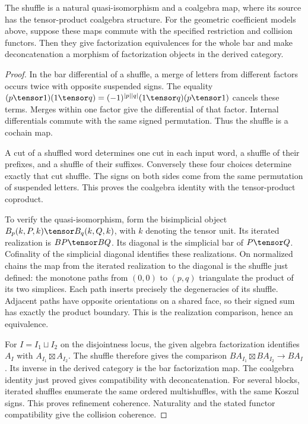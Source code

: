 \begin{proposition}
The shuffle is a natural quasi-isomorphism and a coalgebra map,
where its source has the tensor-product coalgebra structure.
For the geometric coefficient models above, suppose these maps commute with the specified
restriction and collision functors.
Then they give factorization equivalences for the whole bar and make
deconcatenation a morphism of factorization objects in the derived category.
\end{proposition}
\begin{proof}
In the bar differential of a shuffle, a merge of letters from different factors
occurs twice with opposite suspended signs.
The equality $(p\tensor1)(1\tensor q)=(-1)^{|p||q|}(1\tensor q)(p\tensor1)$ cancels these terms.
Merges within one factor give the differential of that factor.
Internal differentials commute with the same signed permutation.
Thus the shuffle is a cochain map.

A cut of a shuffled word determines one cut in each input word,
a shuffle of their prefixes, and a shuffle of their suffixes.
Conversely these four choices determine exactly that cut shuffle.
The signs on both sides come from the same permutation of suspended letters.
This proves the coalgebra identity with the tensor-product coproduct.

To verify the quasi-isomorphism, form the bisimplicial object
$B_p(k,P,k)\tensor B_q(k,Q,k)$, with $k$ denoting the tensor unit.
Its iterated realization is $BP\tensor BQ$.
Its diagonal is the simplicial bar of $P\tensor Q$.
Cofinality of the simplicial diagonal identifies these realizations.
On normalized chains the map from the iterated realization to the diagonal
is the shuffle just defined: the monotone paths from $(0,0)$ to $(p,q)$
triangulate the product of its two simplices.
Each path inserts precisely the degeneracies of its shuffle.
Adjacent paths have opposite orientations on a shared face,
so their signed sum has exactly the product boundary.
This is the realization comparison, hence an equivalence.

For $I=I_1\sqcup I_2$ on the disjointness locus, the given algebra factorization
identifies $A_I$ with $A_{I_1}\boxtimes A_{I_2}$.
The shuffle therefore gives the comparison
$BA_{I_1}\boxtimes BA_{I_2}\to BA_I$.
Its inverse in the derived category is the bar factorization map.
The coalgebra identity just proved gives compatibility with deconcatenation.
For several blocks, iterated shuffles enumerate the same ordered multishuffles,
with the same Koszul signs. This proves refinement coherence.
Naturality and the stated functor compatibility give the collision coherence.
\end{proof}

